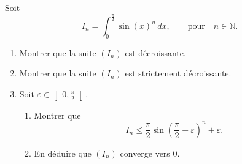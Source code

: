 \documentclass[a4paper, 11pt,openany]{book}%
\newtheorem[L]{thm}{Théorème}[section]
\newtheorem[M]{propo}[thm]{Proposition}
\newtheorem[M]{prop}[thm]{Propriété}
\newtheorem[M]{coro}[thm]{Corollaire}
\newtheorem[M]{lem}[thm]{Lemme}
\newtheorem[M,bodystyle=]{defi}[thm]{Définition}
\newtheorem[M,bodystyle=]{remark}[thm]{Remarque}
\newtheorem[M,bodystyle=]{met}[thm]{Méthode}
\newtheorem[M,bodystyle=]{ret}[thm]{A retenir}
\newtheorem[M,bodystyle=]{idee}[thm]{Idée}
\newtheorem[style=S,underline=false,bodystyle=]{exem}[thm]{Exemple}
\newtheorem[S,underline=false,bodystyle=]{exo}[thm]{Exercice}
\newtheorem[S,underline=false,bodystyle=]{appli}[thm]{Application}
\newtheorem[S,underline=false,bodystyle=]{sol}[thm]{Solution}
\newtheorem[S,underline=false,bodystyle=]{hypo}[thm]{Hypothesis}
\newtheorem[S,underline=false,bodystyle=]{nota}[thm]{Notation}
\begin{document}
\begin{exo}

Soit 
\[ I_n= \int_0^{\frac{\pi}{2}} \sin(x)^n \, dx, \quad \quad \text{pour} \quad n\in \mathbb{N}.\]
\begin{enumerate}
\item Montrer que la suite $(I_n)$ est décroissante.
\item Montrer que la suite $(I_n)$ est strictement décroissante.
\item Soit $\varepsilon \in \left] 0 ,\frac{\pi}{2} \right[$. \begin{enumerate}
\item  Montrer que 
\[ I_n \leqslant \frac{\pi}{2} \sin \left( \frac{\pi}{2} - \varepsilon \right)^n + \varepsilon.\]
\item En déduire que $(I_n)$ converge vers $0$.
\end{enumerate}
\end{enumerate}

\end{exo}
\end{document}
